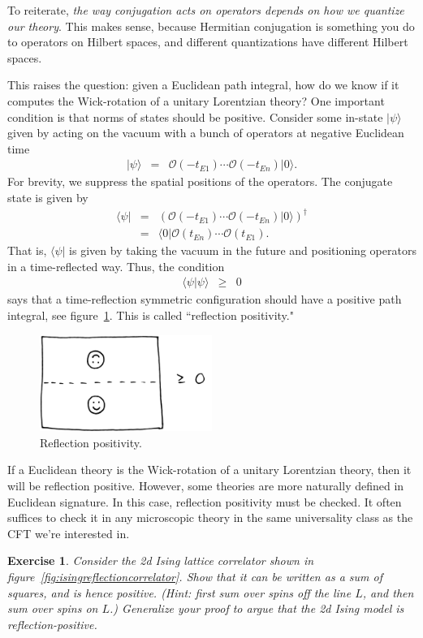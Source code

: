 \documentclass{ws-rv9x6}
\newcommand\be{\begin{eqnarray}}
\newcommand\ee{\end{eqnarray}}
\newcommand\cO{\mathcal{O}}
\newcommand\<\langle
\renewcommand\>\rangle
\newcommand\nn{\nonumber}
\renewcommand\.{\cdot}
\newtheorem{exercise}{Exercise}[section]
\begin{document}
To reiterate, {\it the way conjugation acts on operators depends on how we quantize our theory}.  This makes sense, because Hermitian conjugation is something you do to operators on Hilbert spaces, and different quantizations have different Hilbert spaces.

This raises the question: given a Euclidean path integral, how do we know if it computes the Wick-rotation of a unitary Lorentzian theory?  One important condition is that norms of states should be positive.  Consider some in-state $|\psi\>$ given by acting on the vacuum with a bunch of operators at negative Euclidean time
\be
|\psi\> &=& \cO(-t_{E1})\cdots\cO(-t_{En})|0\>.
\ee
For brevity, we suppress the spatial positions of the operators.
The conjugate state is given by
\be
\<\psi| &=& (\cO(-t_{E1})\cdots\cO(-t_{En})|0\>)^\dag \nn \\
&=& \<0|\cO(t_{En})\cdots\cO(t_{E1}).
\ee
That is, $\<\psi|$ is given by taking the vacuum in the future and positioning operators in a time-reflected way.  Thus, the condition
\be
\<\psi|\psi\> &\geq& 0
\ee
says that a time-reflection symmetric configuration should have a positive path integral, see figure~\ref{fig:reflectionpositivity}.  This is called ``reflection positivity."

\begin{figure}
\begin{center}
\includegraphics[width=0.5\textwidth]{reflectionpositivity.jpg}
\end{center}
\caption{Reflection positivity.  \label{fig:reflectionpositivity}}
\end{figure}

If a Euclidean theory is the Wick-rotation of a unitary Lorentzian theory, then it will be reflection positive.  However, some theories are more naturally defined in Euclidean signature.  In this case, reflection positivity must be checked.  It often suffices to check it in any microscopic theory in the same universality class as the CFT we're interested in.
\begin{exercise}
Consider the 2d Ising lattice correlator shown in figure~\ref{fig:isingreflectioncorrelator}.  Show that it can be written as a sum of squares, and is hence positive. (Hint: first sum over spins off the line $L$, and then sum over spins on $L$.) Generalize your proof to argue that the 2d Ising model is reflection-positive.
\end{exercise}
\end{document}
